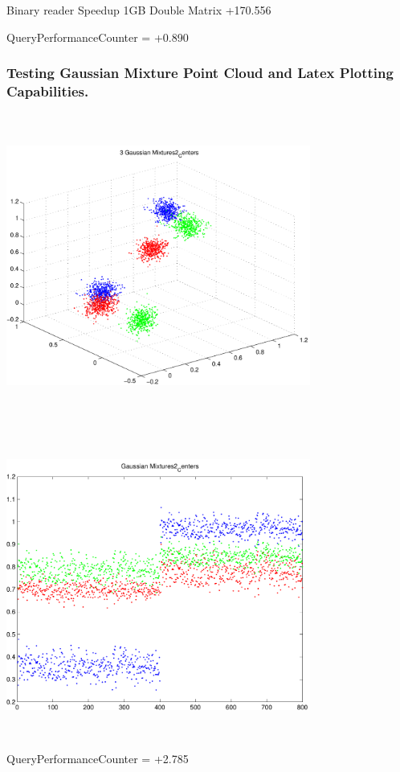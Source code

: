\documentclass[9pt]{article}
\theoremstyle{plain}
\theoremstyle{definition}
\theoremstyle{remark}
\numberwithin{equation}{section}
\begin{document}
Binary reader Speedup 1GB Double Matrix +170.556

QueryPerformanceCounter  =  +0.890
\subsubsection{Testing Gaussian Mixture Point Cloud and Latex Plotting Capabilities.}
\includegraphics[width=10.0cm,height=10.0cm]{GaussianMixture_Dim_3_Centers2.pdf}

\includegraphics[width=10.0cm,height=10.0cm]{GaussianMixture_Dim_1_Centers2.pdf}

QueryPerformanceCounter  =  +2.785
\end{document}
